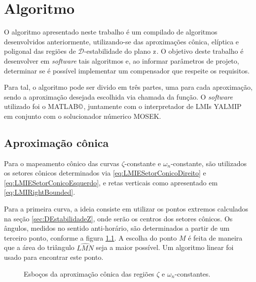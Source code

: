\chapter{Algoritmo}\label{sec:Algoritmo}

O algoritmo apresentado neste trabalho é um compilado de algoritmos desenvolvidos anteriormente, utilizando-se das aproximações cônica, elíptica e poligonal das regiões de $\mathscr{D}$-estabilidade do plano $\operatorname{\mathrm{z}}$. O objetivo deste trabalho é desenvolver em \emph{software} tais algoritmos e, ao informar parâmetros de projeto, determinar se é possível implementar um compensador que respeite os requisitos.

Para tal, o algoritmo pode ser divido em três partes, uma para cada aproximação, sendo a aproximação desejada escolhida via chamada da função. O \emph{software} utilizado foi o MATLAB$\copyright$\cite{MATLAB}, juntamente com o interpretador de LMIs YALMIP\cite{LOFBERG2004} em conjunto com o solucionador númerico MOSEK\cite{MOSEK}. 

\section{Aproximação cônica}
Para o mapeamento cônico das curvas $\zeta$-constante e $\omega_n$-constante, são utilizados os setores cônicos determinados via \eqref{eq:LMIESetorConicoDireito} e \eqref{eq:LMIESetorConicoEsquerdo}, e retas verticais como apresentado em \eqref{eq:LMIRightBounded}.

Para a primeira curva, a ideia consiste em utilizar os pontos extremos calculados na seção \ref{sec:DEstabilidadeZ}, onde serão os centros dos setores cônicos. Os ângulos, medidos no sentido anti-horário, são determinados a partir de um terceiro ponto, conforme a figura \ref{subfig:AproximacaoConicaZeta}. A escolha do ponto $M$ é feita de maneira que a área do triângulo $\widehat{LMN}$ seja a maior possível. Um algoritmo linear foi usado para encontrar este ponto.

\begin{figure}[!hb]
  \centering
  \begin{subfigure}[t]{0.4\columnwidth}
      
      \caption{}
      \label{subfig:AproximacaoConicaZeta}
  \end{subfigure}
  \begin{subfigure}[t]{0.4\columnwidth}
      
      \caption{}
      \label{subfig:AproximacaoConicaWn}
  \end{subfigure}
  \caption{Esboços da aproximação cônica das regiões $\zeta$ e $\omega_n$-constantes.}
  \label{fig:AproximacoesConica}
\end{figure}

